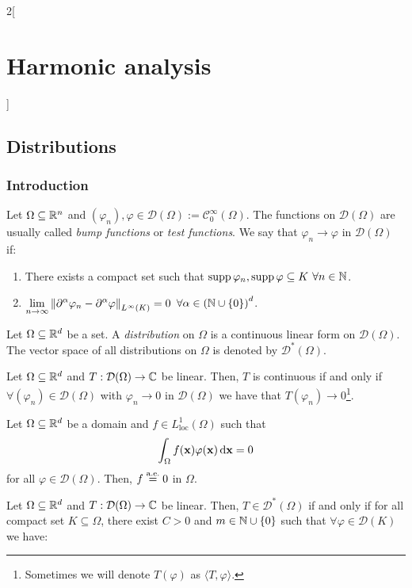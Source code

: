 \documentclass[../../../main_math.tex]{subfiles}
\begin{document}
\begin{multicols}{2}[\section{Harmonic analysis}]
  \subsection{Distributions}
  \subsubsection{Introduction}
  \begin{definition}
    Let $\Omega\subseteq \mathbb{R}^n$ and $(\varphi_n),\varphi\in\mathcal{D}(\Omega):=\mathcal{C}_0^\infty(\Omega)$. The functions on $\mathcal{D}(\Omega)$ are usually called \emph{bump functions} or \emph{test functions}. We say that $\varphi_n\rightarrow \varphi$ in $\mathcal{D}(\Omega)$ if:
    \begin{enumerate}
      \item There exists a compact set such that $\operatorname{supp} \varphi_n, \operatorname{supp} \varphi\subseteq K$ $\forall n\in\mathbb{N}$.
      \item $\displaystyle\lim_{n\to\infty}\left\|\partial^\alpha\varphi_n-\partial^\alpha\varphi\right\|_{L^\infty(K)}=0$ $\forall \alpha\in{(\ensuremath{\mathbb{N}}\cup\{0\})}^d$.
    \end{enumerate}
  \end{definition}
  \begin{definition}[Distribution]
    Let $\Omega\subseteq \mathbb{R}^d$ be a set. A \emph{distribution} on $\Omega$ is a continuous linear form on $\mathcal{D}(\Omega)$. The vector space of all distributions on $\Omega$ is denoted by $\mathcal{D}^*(\Omega)$.
  \end{definition}
  \begin{lemma}
    Let $\Omega\subseteq\mathbb{R}^d$ and $T:\mathcal{D}(\Omega)\rightarrow\mathbb{C}$ be linear. Then, $T$ is continuous if and only if $\forall (\varphi_n)\in\mathcal{D}(\Omega)$ with $\varphi_n\rightarrow 0$ in $\mathcal{D}(\Omega)$ we have that $T(\varphi_n)\rightarrow 0$\footnote{Sometimes we will denote $T(\varphi)$ as $\langle T,\varphi\rangle$.}.
  \end{lemma}
  \begin{lemma}\label{HA:fundamentallemma}
    Let $\Omega\subseteq\mathbb{R}^d$ be a domain and $f\in L_\mathrm{loc}^1(\Omega)$ such that $$\int_\Omega f(\boldsymbol{\mathrm{x}})\varphi(\boldsymbol{\mathrm{x}})\dd{\boldsymbol{\mathrm{x}}}=0$$ for all $\varphi\in\mathcal{D}(\Omega)$. Then, $f\overset{\text{a.e.}}{=}0$ in $\Omega$.
  \end{lemma}
  \begin{proposition}
    Let $\Omega\subseteq\mathbb{R}^d$ and $T:\mathcal{D}(\Omega)\rightarrow\mathbb{C}$ be linear. Then, $T\in \mathcal{D}^*(\Omega)$ if and only if for all compact set $K\subseteq \Omega$, there exist $C>0$ and $m\in\mathbb{N}\cup\{0\}$ such that $\forall \varphi\in\mathcal{D}(K)$ we have:

\end{proposition}
\end{multicols}
\end{document}

